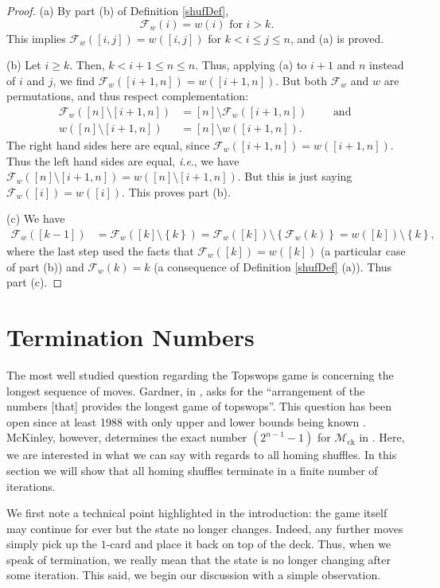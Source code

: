 \documentclass[final,nomarks]{dmtcs-episciences}
\theoremstyle{definition}
\theoremstyle{definition}
\theoremstyle{remark}
\newcommand{\fw}{\mathcal{F}_w} %
\newcommand{\mck}{\mathcal{M}_{\text{ck}}} %
\newcommand{\tup}[1]{\left( #1 \right)}
\newcommand{\set}[1]{\left\{ #1 \right\}}
\begin{document}
\begin{proof}
(a) By part (b) of Definition \ref{shufDef},
    \[
    \fw\tup{ i } = w\tup{ i } \text{ for } i > k.
    \]
This implies $ \fw\tup{ [i,j] } = w\tup{ [i,j] } $ for $ k < i \le j \le n$, and (a) is proved.

(b) Let $i \geq k$. Then, $k < i+1 \leq n \leq n$. Thus, applying (a) to $i+1$ and $n$ instead of $i$ and $j$, we find $\fw\tup{ [i+1,n] } = w\tup{ [i+1,n] }$.
But both $\fw$ and $w$ are permutations, and thus respect complementation:
\begin{align*}
\fw\tup{[n] \setminus [i+1,n]} &= [n] \setminus \fw\tup{[i+1,n]}
\qquad \text{ and } \\
w\tup{[n] \setminus [i+1,n]} &= [n] \setminus w\tup{[i+1,n]}.
\end{align*}
The right hand sides here are equal, since $\fw\tup{ [i+1,n] } = w\tup{ [i+1,n] }$. Thus the left hand sides are equal, \textit{i.e}., we have $\fw\tup{[n] \setminus [i+1,n]} = w\tup{[n] \setminus [i+1,n]}$. But this is just saying $\fw\tup{[i]} = w\tup{[i]}$. This proves part (b).

(c) We have
\begin{align*}
\fw\tup{[k-1]}
&= \fw\tup{[k] \setminus \set{k}}
= \fw\tup{[k]} \setminus \set{\fw\tup{k}}
= w\tup{[k]} \setminus \set{k} ,
\end{align*}
where the last step used the facts that $ \fw\tup{[k]} =w\tup{[k]}$ (a particular case of part (b)) and $\fw\tup{k} = k$ (a consequence of Definition \ref{shufDef} (a)).
Thus part (c).
\end{proof}

\section{Termination Numbers}

The most well studied question regarding the Topswops game is concerning the longest sequence of moves.
Gardner, in \cite{gardner2020}, asks for the ``arrangement of the numbers [that] provides the longest game of topswops''.
This question has been open since at least 1988 with only upper and lower bounds being known \cite{gardner2020,TAoCP4A,morales2010}.
McKinley, however, determines the exact number $(2^{n-1}-1)$ for $\mck$ in \cite{McK2015}.
Here, we are interested in what we can say with regards to all homing shuffles.
In this section we will show that all homing shuffles terminate in a finite number of iterations.

We first note a technical point highlighted in the introduction: the game itself may continue for ever but the state no longer changes. Indeed, any further moves simply pick up the $1$-card and place it back on top of the deck.
Thus, when we speak of termination, we really mean that the state is no longer changing after some iteration. This said, we begin our discussion with a simple observation.
\end{document}

